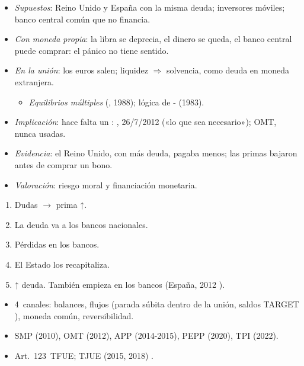 \documentclass{article}
\begin{document}
\begin{columnas}
\begin{itemize}
\item \emph{Supuestos}: Reino Unido y España con la misma deuda; inversores móviles; banco central común que no financia.
\item \emph{Con moneda propia}: la libra se deprecia, el dinero se queda, el banco central puede comprar: el pánico no tiene sentido.
\item \emph{En la unión}: los euros salen; liquidez $\Rightarrow$ solvencia, como deuda en moneda extranjera.
  \begin{itemize}
  \item \emph{Equilibrios múltiples} (, 1988); lógica de - (1983).
  \end{itemize}
\item \emph{Implicación}: hace falta un : , 26/7/2012 («lo que sea necesario»); OMT, nunca usadas.
\item \emph{Evidencia}: el Reino Unido, con más deuda, pagaba menos; las primas bajaron antes de comprar un bono.
\item \emph{Valoración}: riesgo moral y financiación monetaria.
\end{itemize}
\begin{enumerate}
\item Dudas $\to$ prima ↑.
\item La deuda va a los bancos nacionales.
\item Pérdidas en los bancos.
\item El Estado los recapitaliza.
\item ↑ deuda. También empieza en los bancos (España, 2012 ).
\end{enumerate}
\begin{itemize}
\item 4~canales: balances, flujos (parada súbita dentro de la unión, saldos TARGET ), moneda común, reversibilidad.
\end{itemize}
\begin{itemize}
\item SMP (2010), OMT (2012), APP (2014-2015), PEPP (2020), TPI (2022).
\item Art.~123~TFUE; TJUE (2015, 2018) .
\end{itemize}


\end{columnas}
\end{document}
